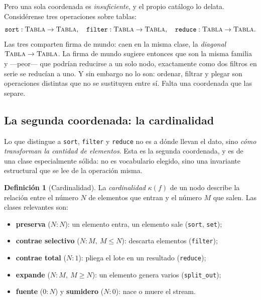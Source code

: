 \documentclass[11pt,a4paper]{article}
\theoremstyle{definition}
\newtheorem{definicion}{Definición}[section]
\theoremstyle{plain}
\newcommand{\mundo}[1]{\textsc{#1}}   %
\begin{document}
Pero una sola coordenada es \emph{insuficiente}, y el propio catálogo lo delata.
Considérense tres operaciones sobre tablas:
\[
  \texttt{sort} : \mundo{Tabla}\to\mundo{Tabla},\quad
  \texttt{filter} : \mundo{Tabla}\to\mundo{Tabla},\quad
  \texttt{reduce} : \mundo{Tabla}\to\mundo{Tabla}.
\]
Las tres comparten firma de mundo: caen en la misma clase, la \emph{diagonal}
$\mundo{Tabla}\to\mundo{Tabla}$. La firma de mundo sugiere entonces que son la misma
familia y ---peor--- que podrían reducirse a un solo nodo, exactamente como dos
filtros en serie se reducían a uno. Y sin embargo no lo son: ordenar, filtrar y
plegar son operaciones distintas que no se sustituyen entre sí. Falta una
coordenada que las separe.

\subsection{La segunda coordenada: la cardinalidad}

Lo que distingue a \texttt{sort}, \texttt{filter} y \texttt{reduce} no es a dónde
llevan el dato, sino \emph{cómo transforman la cantidad de elementos}. Esta es la
segunda coordenada, y es de una clase especialmente sólida: no es vocabulario
elegido, sino una invariante estructural que se lee de la operación misma.

\begin{definicion}[Cardinalidad]
La \emph{cardinalidad} $\kappa(f)$ de un nodo describe la relación entre el número
$N$ de elementos que entran y el número $M$ que salen. Las clases relevantes son:
\begin{itemize}[nosep,leftmargin=1.4em]
  \item \textbf{preserva} ($N{:}N$): un elemento entra, un elemento sale
        (\texttt{sort}, \texttt{set});
  \item \textbf{contrae selectivo} ($N{:}M,\ M\le N$): descarta elementos
        (\texttt{filter});
  \item \textbf{contrae total} ($N{:}1$): pliega el lote en un resultado
        (\texttt{reduce});
  \item \textbf{expande} ($N{:}M,\ M\ge N$): un elemento genera varios
        (\texttt{split\_out});
  \item \textbf{fuente} ($0{:}N$) y \textbf{sumidero} ($N{:}0$): nace o muere el
        stream.
\end{itemize}
\end{definicion}
\end{document}
